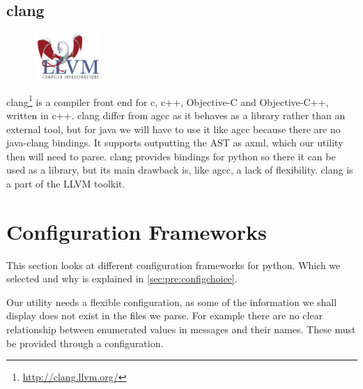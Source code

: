 \subsection{\Gls{clang}}
\label{sec:pre:clang}
\begin{figure}
	\vspace{-20pt}
	\includegraphics[width=2.5cm]{./planning/img/llvm_logo}
	\vspace{-20pt}
\end{figure}
\Gls{clang}\footnote{\url{http://clang.llvm.org/}} is a compiler front end for \Gls{c}, 
\Gls{c++}, \Gls{Objective-C} and \Gls{Objective-C++}, written in \Gls{c++}. \Gls{clang} differ from \Gls{agcc} as it
behaves as a \gls{library} rather than an external tool, but for \Gls{java} we will have to
use it like \Gls{agcc} because there are no \Gls{java}-\Gls{clang} bindings. It supports
outputting the \gls{AST} as \Gls{axml}, which our \gls{utility} then will need to
parse. \Gls{clang} provides bindings for \Gls{python} so there it can be used as a \gls{library},
but its main drawback is, like \Gls{agcc}, a lack of flexibility. \Gls{clang} is a part of
the LLVM toolkit.


\section{Configuration Frameworks}
\label{sec:pre:config}
This section looks at different configuration frameworks for \Gls{python}. Which we
selected and why is explained in \autoref{sec:pre:configchoice}.

Our \gls{utility} needs a flexible configuration, as some of the information we
shall display does not exist in the files we parse. For example there are no
clear relationship between enumerated values in messages and their names.
These must be provided through a configuration.

